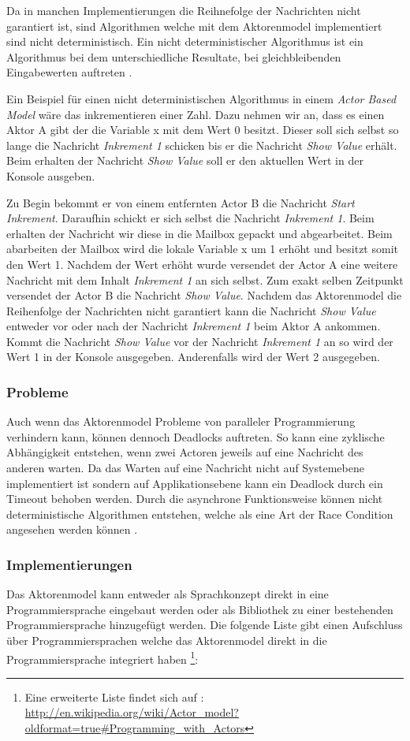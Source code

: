 Da in manchen Implementierungen die Reihnefolge der Nachrichten nicht garantiert ist, sind Algorithmen welche mit dem Aktorenmodel implementiert sind nicht deterministisch. Ein nicht deterministischer Algorithmus ist ein Algorithmus bei dem unterschiedliche Resultate, bei gleichbleibenden Eingabewerten auftreten \cite[]{Agh85}. 

Ein Beispiel für einen nicht deterministischen Algorithmus in einem \emph{Actor Based Model} wäre das  inkrementieren einer Zahl. Dazu nehmen wir an, dass es einen Aktor A gibt der die Variable x mit dem Wert 0 besitzt. Dieser soll sich selbst so lange die Nachricht \emph{Inkrement 1} schicken bis er die Nachricht \emph{Show Value} erhält. Beim erhalten der Nachricht \emph{Show Value} soll er den aktuellen Wert in der Konsole ausgeben.

Zu Begin bekommt er von einem entfernten Actor B die Nachricht \emph{Start Inkrement}. Daraufhin schickt er sich selbst die Nachricht \emph{Inkrement 1}. Beim erhalten der Nachricht wir diese in die Mailbox gepackt und abgearbeitet. Beim abarbeiten der Mailbox wird die lokale Variable x um 1 erhöht und besitzt somit den Wert 1. Nachdem der Wert erhöht wurde versendet der Actor A eine weitere Nachricht mit dem Inhalt \emph{Inkrement 1} an sich selbst. Zum exakt selben Zeitpunkt versendet der Actor B die Nachricht \emph{Show Value}. Nachdem das Aktorenmodel  die Reihenfolge der Nachrichten nicht garantiert kann die Nachricht \emph{Show Value} entweder vor oder nach der Nachricht \emph{Inkrement 1} beim Aktor A ankommen. Kommt die Nachricht \emph{Show Value} vor der Nachricht \emph{Inkrement 1} an so wird der Wert 1 in der Konsole ausgegeben. Anderenfalls wird der Wert 2 ausgegeben.

\subsubsection{Probleme}
Auch wenn das Aktorenmodel Probleme von paralleler Programmierung verhindern kann, können dennoch Deadlocks auftreten. So kann eine zyklische Abhängigkeit entstehen, wenn zwei Actoren jeweils auf eine Nachricht des anderen warten. Da das Warten auf eine Nachricht nicht auf Systemebene implementiert ist sondern auf Applikationsebene kann ein Deadlock durch ein Timeout behoben werden. Durch die asynchrone Funktionsweise können nicht deterministische Algorithmen entstehen, welche als eine Art der Race Condition angesehen werden können \cite[p. 86]{Erb2012}.

\subsubsection{Implementierungen}
Das Aktorenmodel kann entweder als Sprachkonzept direkt in eine Programmiersprache eingebaut werden oder als Bibliothek zu einer bestehenden Programmiersprache hinzugefügt werden. Die folgende Liste gibt einen Aufschluss über Programmiersprachen welche das Aktorenmodel direkt in die Programmiersprache integriert haben \footnote{Eine erweiterte Liste findet sich auf  \cite[p. 86]{Erb2012}: \url{http://en.wikipedia.org/wiki/Actor_model?oldformat=true#Programming_with_Actors}}:

